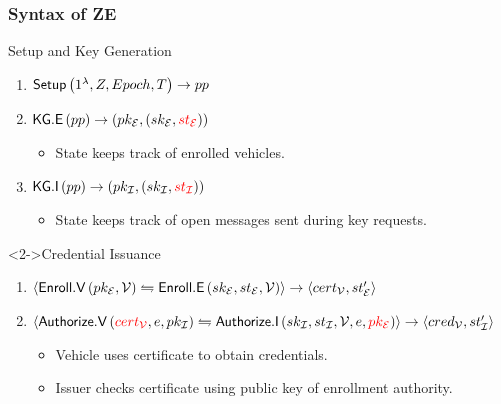 \documentclass{beamer}
\begin{document}
    \begin{frame}
        \frametitle{Syntax of ZE}
        \begin{block}{Setup and Key Generation}
            \begin{enumerate}
                \item \(\mathsf{Setup}\left(1^{\lambda},Z,Epoch,T\right) \rightarrow
                pp\)
                \item \(\mathsf{KG.E}\left(pp\right) \rightarrow
                \left(pk_{\mathcal E},\left(sk_{\mathcal E},\textcolor{red}{st_{\mathcal E}}\right)\right)\)
                \begin{itemize}
                    \item State keeps track of enrolled vehicles.
                \end{itemize}
                \item \(\mathsf{KG.I}\left(pp\right) \rightarrow
                \left(pk_{\mathcal I},\left(sk_{\mathcal I},\textcolor{red}{st_{\mathcal I}}\right)\right)\)
                \begin{itemize}
                    \item State keeps track of open messages sent during key
                    requests.
                \end{itemize}
            \end{enumerate}
        \end{block}
        \begin{block}<2->{Credential Issuance}
            \begin{enumerate}
                \item \(\left\langle \mathsf{Enroll.V}\left(pk_{\mathcal E},\mathcal V\right)
                \leftrightharpoons
                \mathsf{Enroll.E}\left(sk_{\mathcal E},st_{\mathcal E},\mathcal V\right) \right\rangle \rightarrow
                \left\langle cert_{\mathcal V},st_{\mathcal E}^{\prime} \right\rangle\)
                \item
                \(\left\langle \mathsf{Authorize.V}\left(\textcolor{red}{cert_{\mathcal V}},e,pk_{\mathcal I}\right)
                \leftrightharpoons
                \mathsf{Authorize.I}\left(sk_{\mathcal I},st_{\mathcal I},\mathcal V,e,\textcolor{red}{pk_{\mathcal E}}\right) \right\rangle
                \rightarrow \left\langle cred_{\mathcal V},st_{\mathcal I}^{\prime} \right\rangle\)
                \begin{itemize}
                    \item<3-> Vehicle uses certificate to obtain credentials.
                    \item<3-> Issuer checks certificate using public key of
                    enrollment authority.
                \end{itemize}
            \end{enumerate}
        \end{block}
    \end{frame}
\end{document}

